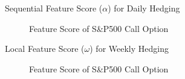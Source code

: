 \documentclass[10pt,table,mathserif]{beamer}
\begin{document}
\begin{frame}[fragile]{Sequential Feature Score ($\alpha$) for Daily Hedging}
\begin{figure}[htp]
  \centering
  \caption{Feature Score of S\&P500 Call Option} \label{fig:call1}
\end{figure}
\end{frame}

\begin{frame}[fragile]{Local Feature Score ($\omega$) for Weekly Hedging}
\begin{figure}[htp]
  \centering
  \caption{Feature Score of S\&P500 Call Option} \label{fig:call1}
\end{figure}
\end{frame}
\end{document}
